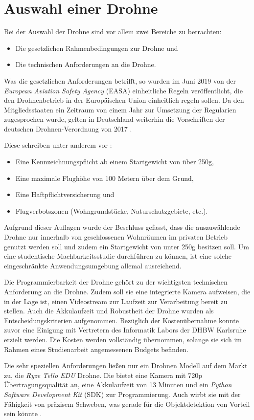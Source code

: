 \section{Auswahl einer Drohne}

Bei der Auswahl der Drohne sind vor allem zwei Bereiche zu betrachten:

\begin{itemize}
	\item Die gesetzlichen Rahmenbedingungen zur Drohne und
	\item Die technischen Anforderungen an die Drohne.
\end{itemize}

Was die gesetzlichen Anforderungen betrifft, so wurden im Juni 2019 von der \textit{European Aviation Safety Agency} (EASA) einheitliche Regeln veröffentlicht, die den Drohnenbetrieb in der Europäischen Union einheitlich regeln sollen. Da den Mitgliedsstaaten ein Zeitraum von einem Jahr zur Umsetzung der Regularien zugesprochen wurde, gelten in Deutschland weiterhin die Vorschriften der deutschen Drohnen-Verordnung von 2017 \cite{EASA.2019}.

Diese schreiben unter anderem vor \cite{Drohnen.de.2020}:
\begin{itemize}
	\item Eine Kennzeichnungspflicht ab einem Startgewicht von über 250g,
	\item Eine maximale Flughöhe von 100 Metern über dem Grund,
	\item Eine Haftpflichtversicherung und
	\item Flugverbotszonen (Wohngrundstücke, Naturschutzgebiete, etc.).
\end{itemize}

Aufgrund dieser Auflagen wurde der Beschluss gefasst, dass die auszuwählende Drohne nur innerhalb von geschlossenen Wohnräumen im privaten Betrieb genutzt werden soll und zudem ein Startgewicht von unter 250g besitzen soll. Um eine studentische Machbarkeitsstudie durchführen zu können, ist eine solche eingeschränkte Anwendungsumgebung allemal ausreichend. 

Die Programmierbarkeit der Drohne gehört zu der wichtigsten technischen Anforderung an die Drohne. Zudem soll sie eine integrierte Kamera aufweisen, die in der Lage ist, einen Videostream zur Laufzeit zur Verarbeitung bereit zu stellen. Auch die Akkulaufzeit und Robustheit der Drohne wurden als Entscheidungskriterien aufgenommen. Bezüglich der Kostenübernahme konnte zuvor eine Einigung mit Vertretern des Informatik Labors der DHBW Karlsruhe erzielt werden. Die Kosten werden vollständig übernommen, solange sie sich im Rahmen eines Studienarbeit angemessenen Budgets befinden.

Die sehr speziellen Anforderungen ließen nur ein Drohnen Modell auf dem Markt zu, die \textit{Ryze Tello EDU} Drohne. Die bietet eine Kamera mit 720p Übertragungsqualität an, eine Akkulaufzeit von 13 Minuten und ein \textit{Python Software Development Kit} (SDK) zur Programmierung. Auch wirbt sie mit der Fähigkeit von präzisem Schweben, was gerade für die Objektdetektion von Vorteil sein könnte \cite{RyzeRobotics.2020}.